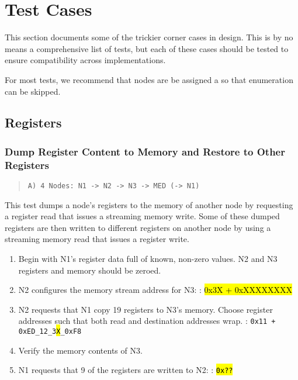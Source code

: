 \section{Test Cases}
\label{appx-tests}
This section documents some of the trickier corner cases in \bus design. This
is by no means a comprehensive list of tests, but each of these cases should
be tested to ensure compatibility across \bus implementations.

For most tests, we recommend that nodes are be assigned a
 so that enumeration can be
skipped.

\subsection{Registers}

\subsubsection{Dump Register Content to Memory and Restore to Other Registers}
\label{test:reg-dump-restore}

\begin{quote}
  \texttt{A) 4 Nodes: N1 -> N2 -> N3 -> MED (-> N1)}
\end{quote}

This test dumps a node's registers to the memory of another node by requesting
a register read that issues a streaming memory write. Some of these dumped
registers are then written to different registers on another node by using a
streaming memory read that issues a register write.

\begin{enumerate}
  \item Begin with N1's register data full of known, non-zero values. N2 and
    N3 registers and memory should be zeroed.
  \item N2 configures the memory stream address for N3:
    \subitem {}: \hl{0x3X + 0xXXXXXXXX}
  \item N2 requests that N1 copy 19 registers to N3's memory. Choose register
    addresses such that both read and destination addresses wrap.
    \subitem {}: \texttt{0x11 + 0xED\_12\_3\hl{X}\_0xF8}
  \item Verify the memory contents of N3.
  \item N1 requests that 9 of the registers are written to N2:
    \subitem {}: \texttt{\hl{0x??}}
\end{enumerate}

